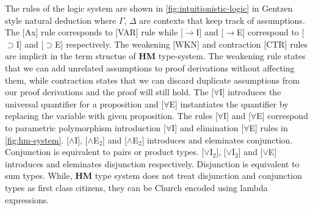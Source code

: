 The rules of the logic system are shown in \cref{fig:intuitionistic-logic} in Gentzen style natural deduction
where $\Gamma$, $\Delta$ are contexts that keep track of assumptions. The [Ax] rule corresponds to [VAR] rule while [$\rightarrow$I] and [$\rightarrow$E] correspond
to [$\supset$I] and [$\supset$E] respectively. The weakening [WKN] and contraction [CTR] rules are implicit in the term structue of \textbf{HM} type-system.
The weakening rule states that we can add unrelated assumptions to proof derivations without
affecting them, while contraction states that we can discard duplicate assumptions from our proof derivations and the proof will still hold.
The [$\forall$I] introduces the universal quantifier for a proposition and [$\forall$E] instantiates
the quantifier by replacing the variable with given proposition. The rules [$\forall$I] and [$\forall$E] correspond to parametric polymorphism
introduction [$\forall$I] and elimination [$\forall$E] rules in \cref{fig:hm-system}. [$\wedge$I], [$\wedge$E$_2$] and [$\wedge$E$_2$] introduces and eleminates
conjunction. Conjunction is equivalent to pairs or product types. [$\vee$I$_2$], [$\vee$I$_2$] and [$\vee$E] introduces and eleminates disjunction respectively.
Disjunction is equivalent to sum types. While, \textbf{HM} type system does not treat disjunction and conjunction types as first class citizens,
they can be Church encoded using lambda expressions\citep{pierce_tapl_2005}.

